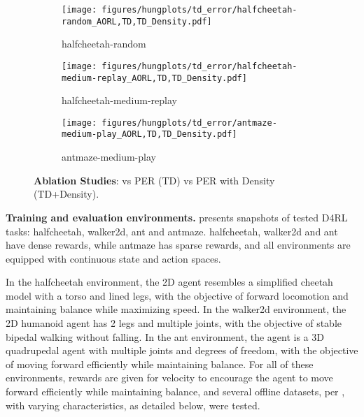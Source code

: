 \begin{figure*}[h]
    \centering
    \begin{subfigure}{.33\textwidth}
        \centering
        \texttt{[image: figures/hungplots/td\_error/halfcheetah-random\_AORL,TD,TD\_Density.pdf]}
        \caption{halfcheetah-random}\label{fig:supp:td_error:1}
    \end{subfigure}\hfil
    \begin{subfigure}{.33\textwidth}
        \centering
        \texttt{[image: figures/hungplots/td\_error/halfcheetah-medium-replay\_AORL,TD,TD\_Density.pdf]}
        \caption{halfcheetah-medium-replay}\label{fig:supp:td_error:2}
    \end{subfigure}\hfil
    \begin{subfigure}{.33\textwidth}
        \centering
        \texttt{[image: figures/hungplots/td\_error/antmaze-medium-play\_AORL,TD,TD\_Density.pdf]}
        \caption{antmaze-medium-play}\label{fig:supp:td_error:3}
    \end{subfigure}\hfil
    \caption{\textbf{Ablation Studies}: \algname vs PER (TD) vs PER with Density (TD+Density).}
  \label{fig:supp:td_error}
\end{figure*}
\textbf{Training and evaluation environments.}  presents snapshots of tested D4RL tasks: halfcheetah, walker2d, ant and antmaze. halfcheetah, walker2d and ant have dense rewards, while antmaze has sparse rewards, and all environments are equipped with continuous state and action spaces.

In the halfcheetah environment, the 2D agent resembles a simplified cheetah model with a torso and lined legs, with the objective of forward locomotion and maintaining balance while maximizing speed. In the walker2d environment, the 2D humanoid agent has 2 legs and multiple joints, with the objective of stable bipedal walking without falling. In the ant environment, the agent is a 3D quadrupedal agent with multiple joints and degrees of freedom, with the objective of moving forward efficiently while maintaining balance. For all of these environments, rewards are given for velocity to encourage the agent to move forward efficiently while maintaining balance, and several offline datasets, per \citep{fu2020d4rl}, with varying characteristics, as detailed below, were tested.

